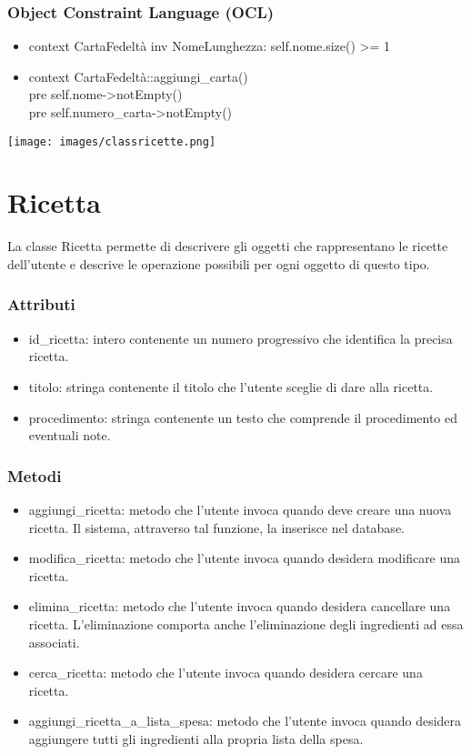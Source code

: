 \documentclass[a4paper,12pt]{article}
\begin{document}
\subsubsection*{Object Constraint Language (OCL)}
\begin{itemize}
\item {\ttfamily context CartaFedeltà inv NomeLunghezza: self.nome.size() >= 1}
\item {\ttfamily context CartaFedeltà::aggiungi\_carta() \\pre self.nome->notEmpty() \\pre self.numero\_carta->notEmpty()}
\end{itemize}
\newpage
\begin{center}
  \texttt{[image: images/classricette.png]}
\end{center}
\section{Ricetta}

La classe {\sffamily Ricetta} permette di descrivere gli oggetti che rappresentano le ricette dell'utente e descrive le operazione possibili per ogni oggetto di questo tipo. 
\subsubsection*{Attributi}
\begin{itemize} \setlength\itemsep{0.01em}
\item {\ttfamily id\_ricetta}: intero contenente un numero progressivo che identifica la precisa ricetta.
\item {\ttfamily titolo}: stringa contenente il titolo che l'utente sceglie di dare alla ricetta.
\item {\ttfamily procedimento}: stringa contenente un testo che comprende il procedimento ed eventuali note.
\end{itemize}
\subsubsection*{Metodi}
\begin{itemize} \setlength\itemsep{0.01em}
\item {\ttfamily aggiungi\_ricetta}: metodo che l'utente invoca quando deve creare una nuova ricetta. Il sistema, attraverso tal funzione, la inserisce nel database.
\item {\ttfamily modifica\_ricetta}: metodo che l'utente invoca quando desidera modificare una ricetta.
\item {\ttfamily elimina\_ricetta}: metodo che l'utente invoca quando desidera cancellare una ricetta. L'eliminazione comporta anche l'eliminazione degli ingredienti ad essa associati.
\item {\ttfamily cerca\_ricetta}: metodo che l'utente invoca quando desidera cercare una ricetta. 
\item {\ttfamily aggiungi\_ricetta\_a\_lista\_spesa}: metodo che l'utente invoca quando desidera aggiungere tutti gli ingredienti alla propria lista della spesa. 

\end{itemize}
\end{document}
